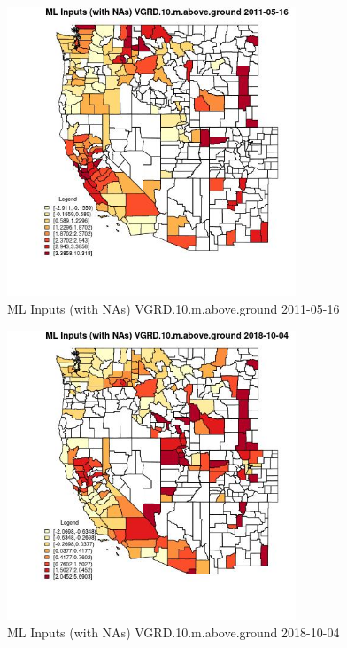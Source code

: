 \begin{figure} 
\centering  
\includegraphics[width=0.77\textwidth]{Code_Outputs/Report_ML_input_PM25_Step4_part_f_de_duplicated_aves_prioritize_24hr_obswNAs_CountyVGRD10mabovegroundMean2011-05-16.jpg} 
\caption{\label{fig:Report_ML_input_PM25_Step4_part_f_de_duplicated_aves_prioritize_24hr_obswNAsCountyVGRD10mabovegroundMean2011-05-16}ML Inputs (with NAs) VGRD.10.m.above.ground 2011-05-16} 
\end{figure} 
 

\begin{figure} 
\centering  
\includegraphics[width=0.77\textwidth]{Code_Outputs/Report_ML_input_PM25_Step4_part_f_de_duplicated_aves_prioritize_24hr_obswNAs_CountyVGRD10mabovegroundMean2018-10-04.jpg} 
\caption{\label{fig:Report_ML_input_PM25_Step4_part_f_de_duplicated_aves_prioritize_24hr_obswNAsCountyVGRD10mabovegroundMean2018-10-04}ML Inputs (with NAs) VGRD.10.m.above.ground 2018-10-04} 
\end{figure} 
 

